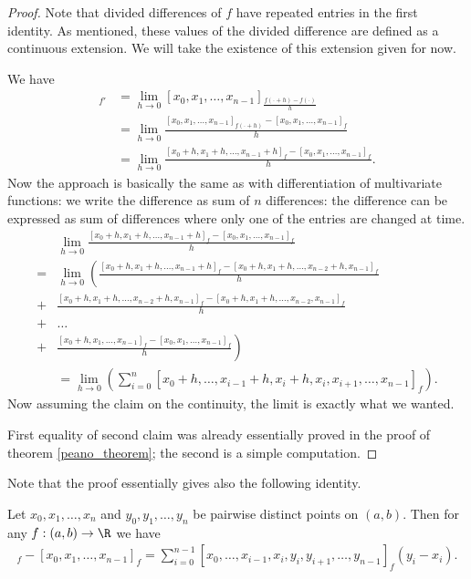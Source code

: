 \begin{proof}
	Note that divided differences of $f$ have repeated entries in the first identity. As mentioned, these values of the divided difference are defined as a continuous extension. We will take the existence of this extension given for now.

	We have
	\begin{align*}
		[x_{0}, x_{1}, \ldots, x_{n - 1}]_{f'} &= \lim_{h \to 0} [x_{0}, x_{1}, \ldots, x_{n - 1}]_{\frac{f(\cdot + h) - f(\cdot)}{h}} \\
		&= \lim_{h \to 0} \frac{[x_{0}, x_{1}, \ldots, x_{n - 1}]_{f(\cdot + h)} -[x_{0}, x_{1}, \ldots, x_{n - 1}]_{f}}{h} \\
		&= \lim_{h \to 0} \frac{[x_{0} + h, x_{1} + h, \ldots, x_{n - 1} + h]_{f} -[x_{0}, x_{1}, \ldots, x_{n - 1}]_{f}}{h}.
	\end{align*}
	Now the approach is basically the same as with differentiation of multivariate functions: we write the difference as sum of $n$ differences: the difference can be expressed as sum of differences where only one of the entries are changed at time.
	\begin{align*}
		& \lim_{h \to 0} \frac{[x_{0} + h, x_{1} + h, \ldots, x_{n - 1} + h]_{f} -[x_{0}, x_{1}, \ldots, x_{n - 1}]_{f}}{h} \\
		=& \lim_{h \to 0} \left(\frac{[x_{0} + h, x_{1} + h, \ldots, x_{n - 1} + h]_{f} - [x_{0} + h, x_{1} + h, \ldots, x_{n - 2} + h,  x_{n - 1}]_{f}}{h} \right. \\
		+& \frac{[x_{0} + h, x_{1} + h, \ldots, x_{n - 2} + h, x_{n - 1}]_{f} - [x_{0} + h, x_{1} + h, \ldots, x_{n - 2}, x_{n - 1}]_{f}}{h} \\
		+& \ldots \\
		+& \left. \frac{[x_{0} + h, x_{1}, \ldots, x_{n - 1}]_{f} - [x_{0}, x_{1}, \ldots, x_{n - 1}]_{f}}{h} \right)\\
		&= \lim_{h \to 0} \left(\sum_{i = 0}^{n} [x_{0} + h, \ldots, x_{i - 1} + h, x_{i} + h, x_{i}, x_{i + 1}, \ldots, x_{n - 1}]_{f} \right).
	\end{align*}
	Now assuming the claim on the continuity, the limit is exactly what we wanted.

	First equality of second claim was already essentially proved in the proof of theorem \ref{peano_theorem}; the second is a simple computation.
\end{proof}

Note that the proof essentially gives also the following identity.
\begin{prop}\label{total_derivative}
	Let $x_{0}, x_{1}, \ldots, x_{n}$ and $y_{0}, y_{1}, \ldots, y_{n}$ be pairwise distinct points on $(a, b)$. Then for any $f : (a, b) \to \R$ we have
	\begin{align*}
		[y_{0}, y_{1}, \ldots, y_{n - 1}]_{f} - [x_{0}, x_{1}, \ldots, x_{n - 1}]_{f} = \sum_{i = 0}^{n - 1} [x_{0}, \ldots, x_{i - 1}, x_{i}, y_{i}, y_{i + 1}, \ldots, y_{n - 1}]_{f} (y_{i} - x_{i}).
	\end{align*}
\end{prop}

